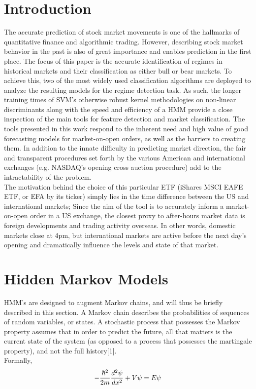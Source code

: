 \documentclass[]{hdsr}
\begin{document}
\restoregeometry
{}

\section{Introduction}
\label{sec1}
The accurate prediction of stock market movements is one of the hallmarks of quantitative finance and algorithmic trading. However, describing stock market behavior in the past is also of great importance and enables prediction in the first place. The focus of this paper is the accurate identification of regimes in historical markets and their classification as either bull or bear markets. To achieve this, two of the most widely used classification algorithms are deployed to analyze the resulting models for the regime detection task. As such, the longer training times of SVM's otherwise robust kernel methodologies on non-linear discriminants along with the speed and efficiency of a HMM provide a close inspection of the main tools for feature detection and market classification. The tools presented in this work respond to the inherent need and high value of good forecasting models for market-on-open orders, as well as the barriers to creating them. In addition to the innate difficulty in predicting market direction, the fair and transparent procedures set forth by the various American and international exchanges (e.g. NASDAQ's opening cross auction procedure) add to the intractability of the problem.\\
The motivation behind the choice of this particular ETF (iShares MSCI EAFE ETF, or EFA by its ticker) simply lies in the time difference between the US and international markets; Since the aim of the tool is to accurately inform a market-on-open order in a US exchange, the closest proxy to after-hours market data is foreign developments and trading activity overseas. In other words, domestic markets close at 4pm, but international markets are active before the next day's opening and dramatically influence the levels and state of that market.


\section{Hidden Markov Models}
\label{sec2}
HMM’s are designed to augment Markov chains, and will thus be briefly described in this section. A Markov chain describes the probabilities of sequences of random variables, or states. A stochastic process that possesses the Markov property assumes that in order to predict the future, all that matters is the current state of the system (as opposed to a process that possesses the martingale property), and not the full history[1].
\\
Formally,
\begin{equation}
-\frac{\hbar^2}{2m} \frac{d^2 \psi}{dx^2} + V\psi = E\psi\\
\end{equation}
\end{document}
